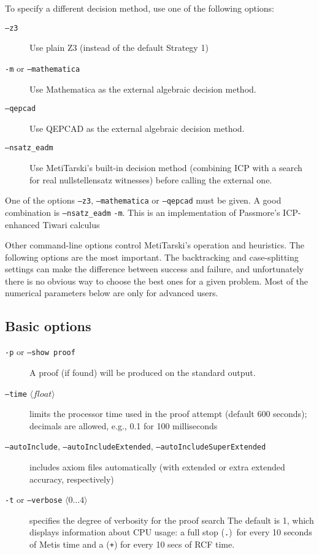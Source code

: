 \documentclass[a4paper,11pt]{scrartcl}
\begin{document}
To specify a different decision method, use one of the following options:
\begin{description}

\item[\texttt{--z3}]
      Use plain Z3 (instead of the default Strategy 1)

\item[\texttt{-m} or \texttt{--mathematica}]
      Use Mathematica as the external algebraic decision method.

\item[\texttt{--qepcad}]
      Use QEPCAD as the external algebraic decision method.

\item[\texttt{--nsatz\_eadm}]
      Use MetiTarski's built-in decision method (combining ICP with a search for real
      nullstellensatz witnesses) before calling the external one.
\end{description}

One of the options \texttt{--z3}, \texttt{--mathematica} or \texttt{--qepcad} must be given.  A good combination is \texttt{--nsatz\_eadm} \texttt{-m}.
      This is an implementation of Passmore's ICP-enhanced Tiwari calculus \cite[\S6.3.3]{passmore-phd}

Other command-line options control MetiTarski's operation and heuristics. The following
options are the most important. The backtracking and case-splitting settings can
make the difference between success and failure, and unfortunately there is no
obvious way to choose the best ones for a given problem. Most of the numerical
parameters below are only for advanced users.

\subsection{Basic options}

\begin{description}

\item[\texttt{-p} or \texttt{--show proof}]
      A proof (if found) will be produced on the standard output.

\item[\texttt{--time} $\langle float\rangle$]
      limits the processor time used in the proof attempt (default 600 seconds);
      decimals are allowed, e.g., 0.1 for 100 milliseconds

\item[\texttt{--autoInclude}, \texttt{--autoIncludeExtended}, \texttt{--autoIncludeSuperExtended}]
      includes axiom files automatically
      (with extended or extra extended accuracy, respectively)

\item[\texttt{-t} or \texttt{--verbose} $\langle 0\ldots 4\rangle$]
      specifies the degree of verbosity for the proof search
      The default is 1, which displays information about CPU usage:
      a full stop (\texttt{.})\ for every 10 seconds of Metis time and a (\texttt{+}) for every 10 secs of RCF time.
\end{description}
\end{document}
